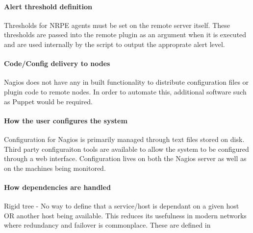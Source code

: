 \documentclass[10pt]{article}
\begin{document}
	\paragraph{Alert threshold definition}
	Thresholds for NRPE agents must be set on the remote server itself.  These thresholds are passed
	into the remote plugin as an argument when it is executed and are used internally by the script to
	output the approprate alert level.
	
	\paragraph{Code/Config delivery to nodes}
	Nagios does not have any in built functionality to distribute configuration files or plugin code to
	remote nodes. In order to automate this, additional software such as Puppet would be required.
	
	\paragraph{How the user configures the system}
	Configuration for Nagios is primarily managed through text files stored on disk.  Third party
	configuraiton tools are available to allow the system to be configured through a web interface.
	Configuration lives on both the Nagios server as well as on the machines being monitored.
	
	\paragraph{How dependencies are handled}
	Rigid tree - No way to define that a service/host is dependant on a given host OR another host being
	available.  This reduces its usefulness in modern networks where redundancy and failover is
	commonplace. These are defined in 
\end{document}
